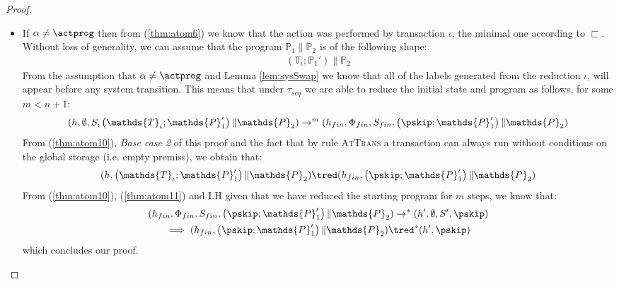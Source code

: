 \begin{thm}
{\begin{proof}
\begin{itemize}
	\item If $\alpha \neq \actprog$ then from (\ref{thm:atom6}) we know that the action was performed by transaction $\iota$, the minimal one according to $\sqsubset$. Without loss of generality, we can assume that the program $\mathds{P}_1 \| \mathds{P}_2$ is of the following shape:
	\begin{gather}
		\left( \mathds{T}_\iota ; \mathds{P}_1' \right) \| \mathds{P}_2
	\end{gather}
	From the assumption that $\alpha \neq \actprog$ and Lemma \ref{lem:sysSwap} we know that all of the labels generated from the reduction $\iota$, will appear before any system transition. This means that under $\tau_{seq}$ we are able to reduce the initial state and program as follows, for some $m < n + 1$:
	\begin{gather}
		\label{thm:atom10}
		(h, \emptyset, S, \left( \mathds{T}_\iota ; \mathds{P}_1' \right) \| \mathds{P}_2) \rightarrow^{m} (h_{fin}, \Phi_{fin}, S_{fin}, \left( \pskip ; \mathds{P}_1' \right) \| \mathds{P}_2)
	\end{gather}
	From (\ref{thm:atom10}), \textit{Base case 2} of this proof and the fact that by rule \textsc{AtTrans} a transaction can always run without conditions on the global storage (i.e. empty premiss), we obtain that:
	\begin{gather}
		\label{thm:atom11}
		(h, \left( \mathds{T}_\iota ; \mathds{P}_1' \right) \| \mathds{P}_2) \tred (h_{fin}, \left( \pskip ; \mathds{P}_1' \right) \| \mathds{P}_2)
	\end{gather}
	From (\ref{thm:atom10}), (\ref{thm:atom11}) and I.H given that we have reduced the starting program for $m$ steps, we know that:
	\begin{gather}
		(h_{fin}, \Phi_{fin}, S_{fin}, \left( \pskip ; \mathds{P}_1' \right) \| \mathds{P}_2) \rightarrow^* (h', \emptyset, S', \pskip) \\
		\implies (h_{fin}, \left( \pskip ; \mathds{P}_1' \right) \| \mathds{P}_2) \tred^* (h', \pskip)
	\end{gather}
	which concludes our proof.
\end{itemize}
\end{proof}
}
\end{thm}